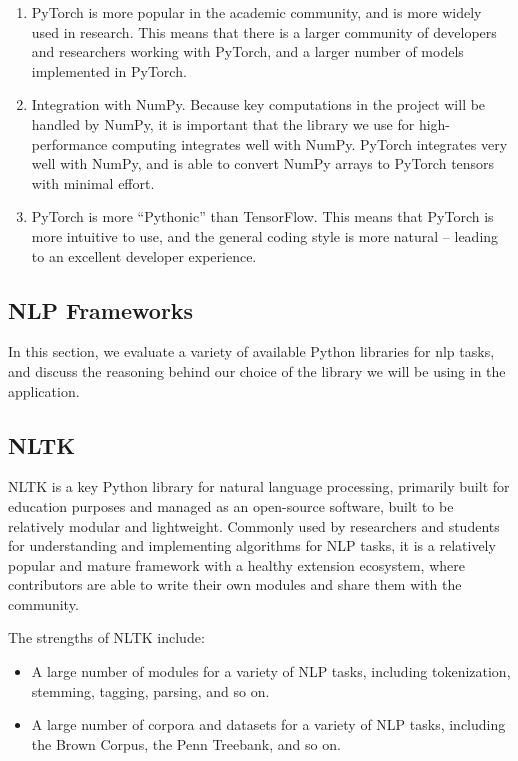 \begin{enumerate}
    \item PyTorch is more popular in the academic community, and is more widely used in research. This means that there is a larger community of developers and researchers working with PyTorch, and a larger number of models implemented in PyTorch. 
    \item Integration with NumPy. Because key computations in the project will be handled by NumPy, it is important that the library we use for high-performance computing integrates well with NumPy. PyTorch integrates very well with NumPy, and is able to convert NumPy arrays to PyTorch tensors with minimal effort.
    \item PyTorch is more ``Pythonic'' than TensorFlow. This means that PyTorch is more intuitive to use, and the general coding style is more natural -- leading to an excellent developer experience.
\end{enumerate}

\subsection{NLP Frameworks}
In this section, we evaluate a variety of available Python libraries for \acrfull{nlp} tasks, and discuss the reasoning behind our choice of the library we will be using in the application.

\subsection*{NLTK}
NLTK is a key Python library for natural language processing, primarily built for education purposes and managed as an open-source software, built to be relatively modular and lightweight. Commonly used by researchers and students for understanding and implementing algorithms for NLP tasks, it is a relatively popular and mature framework with a healthy extension ecosystem, where contributors are able to write their own modules and share them with the community.  

The strengths of NLTK include: 
\begin{itemize}
    \item A large number of modules for a variety of NLP tasks, including tokenization, stemming, tagging, parsing, and so on.
    \item A large number of corpora and datasets for a variety of NLP tasks, including the Brown Corpus, the Penn Treebank, and so on.
\end{itemize}

